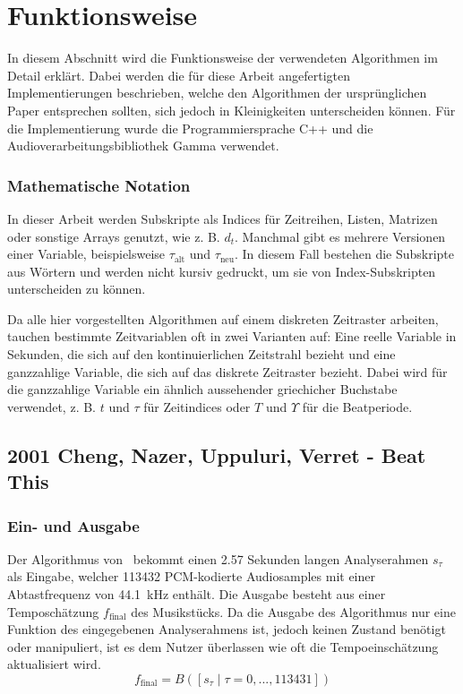 \section{Funktionsweise}
{
	In diesem Abschnitt wird die Funktionsweise der verwendeten Algorithmen im Detail erklärt.
	Dabei werden die für diese Arbeit angefertigten Implementierungen beschrieben,
		welche den Algorithmen der ursprünglichen Paper entsprechen sollten,
		sich jedoch in Kleinigkeiten unterscheiden können.
	Für die Implementierung wurde die Programmiersprache C++ und die Audioverarbeitungsbibliothek Gamma verwendet.

	\subsubsection*{Mathematische Notation}
	{
		In dieser Arbeit werden Subskripte als Indices für Zeitreihen, Listen, Matrizen oder sonstige Arrays genutzt,
			wie z. B. $d_t$.
		Manchmal gibt es mehrere Versionen einer Variable,
			beispielsweise $\tau_\text{alt}$ und $\tau_\text{neu}$.
		In diesem Fall bestehen die Subskripte aus Wörtern und werden nicht kursiv gedruckt,
			um sie von Index-Subskripten unterscheiden zu können.

		Da alle hier vorgestellten Algorithmen auf einem diskreten Zeitraster arbeiten,
			tauchen bestimmte Zeitvariablen oft in zwei Varianten auf:
		Eine reelle Variable in Sekunden,
			die sich auf den kontinuierlichen Zeitstrahl bezieht
			und eine ganzzahlige Variable,
			die sich auf das diskrete Zeitraster bezieht.
		Dabei wird für die ganzzahlige Variable ein ähnlich aussehender griechicher Buchstabe verwendet,
			z. B. $t$ und $\tau$ für Zeitindices
			oder $T$ und $\Upsilon$ für die Beatperiode.
	}

	\subsection{2001 Cheng, Nazer, Uppuluri, Verret - Beat This}
	{
		\subsubsection*{Ein- und Ausgabe}
		{
			Der Algorithmus von~\cite{2001_BeatThis} bekommt einen \num{2.57} Sekunden langen Analyserahmen $s_\tau$ als Eingabe,
				welcher \num{113432} PCM-kodierte Audiosamples mit einer Abtastfrequenz von \SI{44.1}{\kilo\hertz} enthält.
			Die Ausgabe besteht aus einer Temposchätzung $f_\text{final}$ des Musikstücks.
			Da die Ausgabe des Algorithmus nur eine Funktion des eingegebenen Analyserahmens ist,
				jedoch keinen Zustand benötigt oder manipuliert,
				ist es dem Nutzer überlassen wie oft die Tempoeinschätzung aktualisiert wird.
			\begin{equation}
				f_\text{final} = B([s_\tau \mid \tau = 0, ..., 113431])
			\end{equation}
		}

}}
